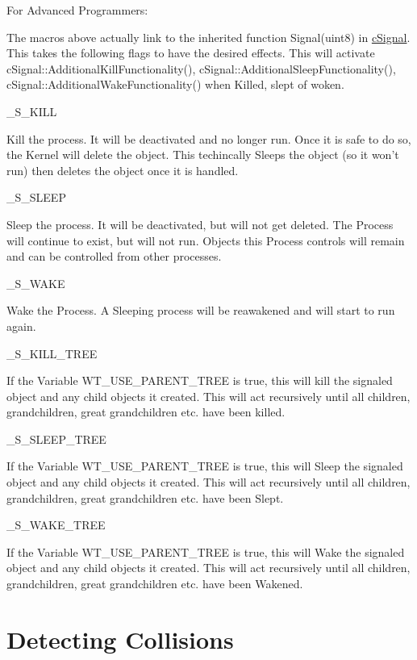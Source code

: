 For Advanced Programmers: \par
 The macros above actually link to the inherited function Signal(uint8) in \hyperlink{classc_signal}{cSignal}. This takes the following flags to have the desired effects. This will activate cSignal::AdditionalKillFunctionality(), cSignal::AdditionalSleepFunctionality(), cSignal::AdditionalWakeFunctionality() when Killed, slept of woken.
\begin{DoxyItemize}
\item \_\-S\_\-KILL
\begin{DoxyItemize}
\item Kill the process. It will be deactivated and no longer run. Once it is safe to do so, the Kernel will delete the object. This techincally Sleeps the object (so it won't run) then deletes the object once it is handled.
\end{DoxyItemize}
\item \_\-S\_\-SLEEP
\begin{DoxyItemize}
\item Sleep the process. It will be deactivated, but will not get deleted. The Process will continue to exist, but will not run. Objects this Process controls will remain and can be controlled from other processes.
\end{DoxyItemize}
\item \_\-S\_\-WAKE
\begin{DoxyItemize}
\item Wake the Process. A Sleeping process will be reawakened and will start to run again.
\end{DoxyItemize}
\item \_\-S\_\-KILL\_\-TREE
\begin{DoxyItemize}
\item If the Variable WT\_\-USE\_\-PARENT\_\-TREE is true, this will kill the signaled object and any child objects it created. This will act recursively until all children, grandchildren, great grandchildren etc. have been killed.
\end{DoxyItemize}
\item \_\-S\_\-SLEEP\_\-TREE
\begin{DoxyItemize}
\item If the Variable WT\_\-USE\_\-PARENT\_\-TREE is true, this will Sleep the signaled object and any child objects it created. This will act recursively until all children, grandchildren, great grandchildren etc. have been Slept.
\end{DoxyItemize}
\item \_\-S\_\-WAKE\_\-TREE
\begin{DoxyItemize}
\item If the Variable WT\_\-USE\_\-PARENT\_\-TREE is true, this will Wake the signaled object and any child objects it created. This will act recursively until all children, grandchildren, great grandchildren etc. have been Wakened.
\end{DoxyItemize}
\end{DoxyItemize}\hypertarget{_using_engine_page_CollisionsPage}{}\section{Detecting Collisions}\label{_using_engine_page_CollisionsPage}
